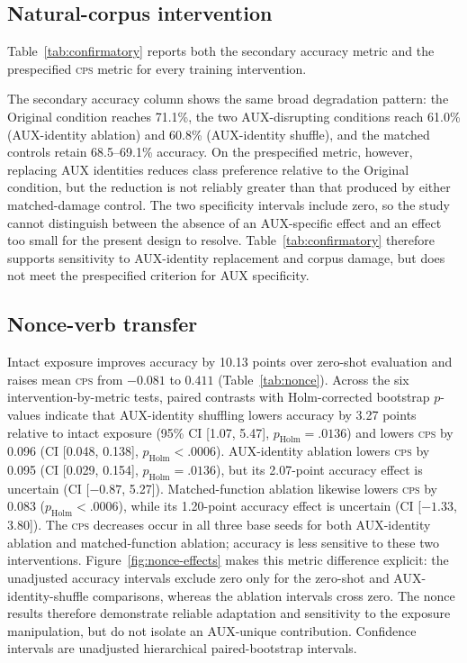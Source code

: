 \documentclass[11pt]{article}
\newcommand{\cps}{\textsc{cps}}
\begin{document}
\subsection{Natural-corpus intervention}

Table~\ref{tab:confirmatory} reports both the secondary accuracy metric and the prespecified \cps{} metric for every training intervention.



The secondary accuracy column shows the same broad degradation pattern: the Original condition reaches 71.1\%, the two AUX-disrupting conditions reach 61.0\% (AUX-identity ablation) and 60.8\% (AUX-identity shuffle), and the matched controls retain 68.5--69.1\% accuracy. On the prespecified metric, however, replacing AUX identities reduces class preference relative to the Original condition, but the reduction is not reliably greater than that produced by either matched-damage control. The two specificity intervals include zero, so the study cannot distinguish between the absence of an AUX-specific effect and an effect too small for the present design to resolve. Table~\ref{tab:confirmatory} therefore supports sensitivity to AUX-identity replacement and corpus damage, but does not meet the prespecified criterion for AUX specificity.

\subsection{Nonce-verb transfer}

Intact exposure improves accuracy by 10.13 points over zero-shot evaluation and raises mean \cps{} from $-0.081$ to $0.411$ (Table~\ref{tab:nonce}). Across the six intervention-by-metric tests, paired contrasts with Holm-corrected bootstrap $p$-values indicate that AUX-identity shuffling lowers accuracy by 3.27 points relative to intact exposure (95\% CI [1.07, 5.47], $p_{\mathrm{Holm}}=.0136$) and lowers \cps{} by 0.096 (CI [0.048, 0.138], $p_{\mathrm{Holm}}<.0006$). AUX-identity ablation lowers \cps{} by 0.095 (CI [0.029, 0.154], $p_{\mathrm{Holm}}=.0136$), but its 2.07-point accuracy effect is uncertain (CI [$-0.87$, 5.27]). Matched-function ablation likewise lowers \cps{} by 0.083 ($p_{\mathrm{Holm}}<.0006$), while its 1.20-point accuracy effect is uncertain (CI [$-1.33$, 3.80]). The \cps{} decreases occur in all three base seeds for both AUX-identity ablation and matched-function ablation; accuracy is less sensitive to these two interventions. Figure~\ref{fig:nonce-effects} makes this metric difference explicit: the unadjusted accuracy intervals exclude zero only for the zero-shot and AUX-identity-shuffle comparisons, whereas the ablation intervals cross zero. The nonce results therefore demonstrate reliable adaptation and sensitivity to the exposure manipulation, but do not isolate an AUX-unique contribution. Confidence intervals are unadjusted hierarchical paired-bootstrap intervals.
\end{document}
